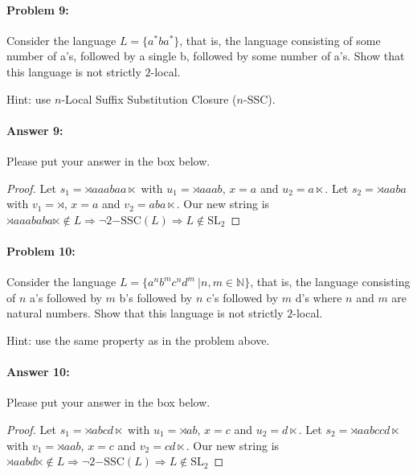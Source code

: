 \documentclass[10pt]{article}
\newenvironment{AnswerBox}{\begin{mdframed}[style=simple]}{\end{mdframed}}
\begin{document}
\hrulefill %

\paragraph{Problem 9:}

Consider the language $L=\{a^* b a^*\}$, that is, the language
consisting of some number of a's, followed by a single b, followed by
some number of a's. Show that this language is not strictly
$2$-local.

 Hint: use $n$-Local Suffix Substitution Closure ($n$-SSC).

\paragraph{Answer 9:} Please put your answer in the box below.


\begin{AnswerBox}%
\begin{proof}
    Let $s_1 = \rtimes aaabaa \ltimes$ with $u_1 = \rtimes aaab$, $x=a$ and $u_2=a\ltimes$. Let $s_2=\rtimes aaba$ with $v_1=\rtimes$, $x=a$ and $v_2=aba\ltimes$. Our new string is $\rtimes aaababa \ltimes \notin L \Rightarrow \neg 2\mathrm{-SSC}(L) \Rightarrow L \notin \mathrm{SL}_2$ 
\end{proof}
    
\end{AnswerBox}%


\hrulefill %

\paragraph{Problem 10:}

Consider the language
$L= \{a^n b^m c^n d^m\ | n, m \in \mathbb{N} \}$, that is, the
language consisting of $n$ a's followed by $m$ b's followed by $n$ c's
followed by $m$ d's where $n$ and $m$ are
natural numbers. Show that this language is not strictly $2$-local.

 Hint: use the same property as in the problem above.

\paragraph{Answer 10:} Please put your answer in the box below.


\begin{AnswerBox}%
\begin{proof}
    Let $s_1 = \rtimes abcd \ltimes$ with $u_1 = \rtimes ab$, $x=c$ and $u_2=d\ltimes$. Let $s_2=\rtimes aabccd\ltimes$ with $v_1=\rtimes aab$, $x=c$ and $v_2=cd\ltimes$. Our new string is $\rtimes aabd \ltimes \notin L \Rightarrow \neg 2\mathrm{-SSC}(L) \Rightarrow L \notin \mathrm{SL}_2$ 
\end{proof}

\end{AnswerBox}%
\end{document}
